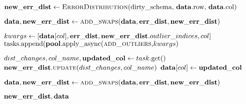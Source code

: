 \begin{algorithm}[!t]
\begin{algorithmic}[1]
	  \STATE $\mathbf{new\_err\_dist} \leftarrow \text{\textsc{ErrorDistribution}(dirty\_schema, \ensuremath{\mathbf{data}}.row, \ensuremath{\mathbf{data}}.col)}$
	  
      
      \STATE $\mathbf{data}, \mathbf{new\_err\_dist} \leftarrow \textsc{add\_swaps}(\mathbf{data}, \mathbf{err\_dist}, \mathbf{new\_err\_dist})$ 
      
      
    
	   {
	    \STATE $kwargs \leftarrow [\mathbf{data}[col], \mathbf{err\_dist}, \mathbf{new\_err\_dist}.outlier\_indices, col]$ 
        \STATE $\text{tasks.append(\ensuremath{\mathbf{pool}}.apply\_async(\textsc{add\_outliers},} kwargs\text{)}$ 
      }\ENDFOR 
      
	   {
        \STATE $dist\_changes, col\_name, \mathbf{updated\_col} \leftarrow task\text{.get()}$ 
        \STATE $\mathbf{new\_err\_dist}.\textsc{update}(dist\_changes, col\_name)$ 
        \STATE $\mathbf{data}[col] \leftarrow \mathbf{updated\_col}$ 
      }\ENDFOR 
      
      \STATE $\mathbf{data}, \mathbf{new\_err\_dist} \leftarrow \textsc{add\_swaps}(\mathbf{data}, \mathbf{err\_dist}, \mathbf{new\_err\_dist})$ 
      
      \RETURN $\mathbf{new\_err\_dist}, \mathbf{data}$
    \end{algorithmic}
\end{algorithm}



